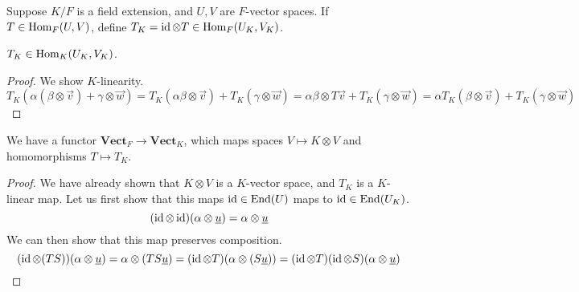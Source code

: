 \begin{definition}
    Suppose \(K/F\) is a field extension, and \(U,V\) are \(F\)-vector spaces.
    If \(T \in \operatorname{Hom}_F(U,V)\), define \(T_K = \operatorname{id} \otimes T \in \operatorname{Hom}_F(U_K,V_K)\).
\end{definition}
\begin{lemma}
    \(T_K \in \operatorname{Hom}_K(U_K,V_K)\).
\end{lemma}
\begin{proof}
    We show \(K\)-linearity.
    \begin{equation*}
        T_K(\alpha(\beta\otimes\vec{v})+\gamma\otimes\vec{w})
        = T_K(\alpha\beta\otimes\vec{v}) + T_K(\gamma\otimes\vec{w})
        = \alpha\beta\otimes T\vec{v} + T_K(\gamma\otimes\vec{w})
        = \alpha T_K(\beta\otimes\vec{v}) + T_K(\gamma\otimes\vec{w})
    \end{equation*}
\end{proof}
\begin{proposition}\label{prop:field-ext-functor}
    We have a functor \(\textbf{Vect}_F \to \textbf{Vect}_K\),
    which maps spaces \(V \mapsto K \otimes V\) and homomorphisms \(T \mapsto T_K\).
\end{proposition}
\begin{proof}
    We have already shown that \(K \otimes V\) is a \(K\)-vector space,
    and \(T_K\) is a \(K\)-linear map.
    Let us first show that this maps \(\operatorname{id} \in \operatorname{End}(U)\) maps to \(\operatorname{id} \in \operatorname{End}(U_K)\).
    \begin{equation*}
        (\operatorname{id}\otimes\operatorname{id})(\alpha\otimes\underline{u}) = \alpha\otimes\underline{u}
    \end{equation*}
    We can then show that this map preserves composition.
    \begin{equation*}
        (\operatorname{id}\otimes(TS))(\alpha\otimes\underline{u})
        = \alpha\otimes(TS\underline{u})
        = (\operatorname{id} \otimes T)(\alpha\otimes(S\underline{u}))
        = (\operatorname{id} \otimes T)(\operatorname{id} \otimes S)(\alpha\otimes\underline{u})
    \end{equation*}
\end{proof}


